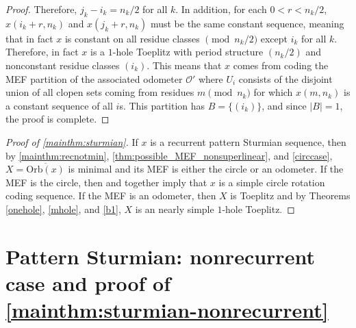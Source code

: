 \documentclass[11pt,reqno]{amsart}
\newtheorem{theorem}{Theorem}[section]
\theoremstyle{definition}
\theoremstyle{plain}
\newcommand{\OO}{\mathrm{Orb}}
\newcommand{\AuthornoteA}[2]{{\sf\small\color{magenta}{[#1: #2]}}}
\newcommand{\AuthornoteR}[2]{{\sf\small\color{blue}{[#1: #2]}}}
\newcommand{\Anote}{\AuthornoteA{A}}
\newcommand{\rp}{\AuthornoteR{R}}
\begin{document}
\begin{proof}
Therefore, $j_k - i_k = n_k/2$ for all $k$. In addition, for each $0 < r < n_k/2$, $x(i_k + r, n_k)$ and $x(j_k + r, n_k)$ must be the same constant sequence, meaning that in fact $x$ is constant on all residue classes $\pmod{n_k/2}$ except $i_k$ for all $k$. Therefore, in fact $x$ is a $1$-hole Toeplitz with period structure $(n_k/2)$ and nonconstant residue classes $(i_k)$. This means that $x$ comes from coding the MEF partition of the associated odometer $\mathcal{O}'$ where $U_i$ consists of the disjoint union of all clopen sets coming from residues $m \pmod{n_k}$ for which $x(m, n_k)$ is a constant sequence of all $i$s. This partition has $B = \{(i_k)\}$, and since $|B| = 1$, the proof is complete.
\end{proof}





\begin{proof}[Proof of \cref{mainthm:sturmian}]

If $x$ is a recurrent pattern Sturmian sequence, then by \cref{mainthm:recnotmin}, \cref{thm:possible_MEF_nonsuperlinear}, and \cref{circcase}, $X = \overline{\OO(x)}$ is minimal and its MEF is either the circle or an odometer. If the MEF is the circle, then  and  together imply that $x$ is a simple circle rotation coding sequence. If the MEF is an odometer, then $X$ is Toeplitz and by Theorems \ref{onehole}, \ref{mhole}, and \ref{b1}, $X$ is an nearly simple $1$-hole Toeplitz.  
\end{proof}

\section{Pattern Sturmian: nonrecurrent case and proof of \texorpdfstring{\cref{mainthm:sturmian-nonrecurrent}}{Theorem B}}
\end{document}
